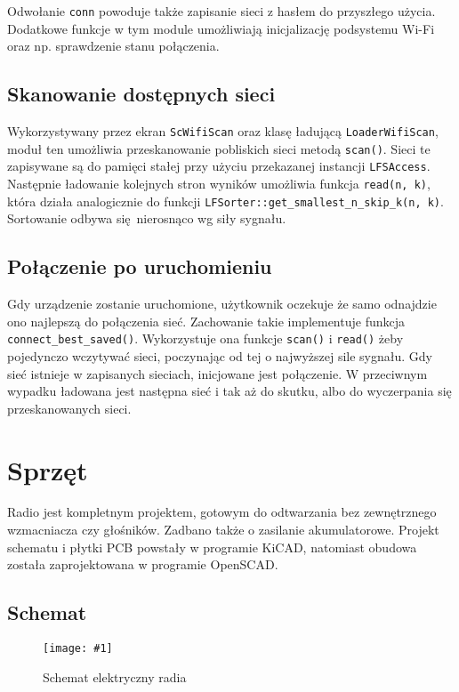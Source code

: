\documentclass[12pt]{report}
\newcommand{\imgint}[4]{
	\begin{figure}[{#4}]
		\centering
		\texttt{[image: \#1]}
		\caption{#2}
		\label{#1}
	\end{figure}
}
\newcommand{\imgh}[3]{\imgint{#1}{#2}{#3}{H}}
\begin{document}
			Odwołanie \lstinline|conn| powoduje także zapisanie sieci z hasłem do przyszłego użycia. Dodatkowe funkcje w tym module umożliwiają inicjalizację podsystemu Wi-Fi oraz np. sprawdzenie stanu połączenia.
			
		\subsection{Skanowanie dostępnych sieci}
			Wykorzystywany przez ekran \lstinline|ScWifiScan| oraz klasę ładującą \lstinline|LoaderWifiScan|, moduł ten umożliwia przeskanowanie pobliskich sieci metodą \lstinline|scan()|. Sieci te zapisywane są do pamięci stałej przy użyciu przekazanej instancji \lstinline|LFSAccess|. Następnie ładowanie kolejnych stron wyników umożliwia funkcja \lstinline|read(n, k)|, która działa analogicznie do funkcji \lstinline|LFSorter::get_smallest_n_skip_k(n, k)|. Sortowanie odbywa się nierosnąco wg siły sygnału.
			
		\subsection{Połączenie po uruchomieniu}
			Gdy urządzenie zostanie uruchomione, użytkownik oczekuje że samo odnajdzie ono najlepszą do połączenia sieć. Zachowanie takie implementuje funkcja \lstinline|connect_best_saved()|. Wykorzystuje ona funkcje \lstinline|scan()| i \lstinline|read()| żeby pojedynczo wczytywać sieci, poczynając od tej o najwyższej sile sygnału. Gdy sieć istnieje w zapisanych sieciach, inicjowane jest połączenie. W przeciwnym wypadku ładowana jest następna sieć i tak aż do skutku, albo do wyczerpania się przeskanowanych sieci.
		
	\section{Sprzęt}
		\label{sec:hw}
		Radio jest kompletnym projektem, gotowym do odtwarzania bez zewnętrznego wzmacniacza czy głośników. Zadbano także o zasilanie akumulatorowe. Projekt schematu i płytki PCB powstały w programie KiCAD\textsuperscript{\cite{hw_kicad}}, natomiast obudowa została zaprojektowana w programie OpenSCAD\textsuperscript{\cite{hw_openscad}}.
	
		\subsection{Schemat}
			\imgh{3/hw_kicad_sch}{Schemat elektryczny radia}{1}
			
\end{document}
